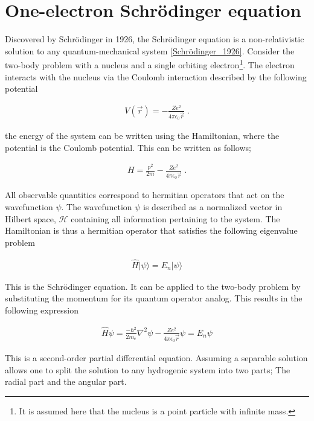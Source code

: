     \section{One-electron Schrödinger equation} \label{sec:Schrodinger_Equation}
        Discovered by Schrödinger in 1926, the Schrödinger equation is a non-relativistic solution to any quantum-mechanical system \ref{Schrödinger_1926}. Consider the two-body problem with a nucleus and a single orbiting electron\footnote{It is assumed here that the nucleus is a point particle with infinite mass.}. The electron interacts with the nucleus via the Coulomb interaction described by the following potential

        \begin{align}
            V(\vec{r}) = -\frac{Z e^2}{4\pi \epsilon_0 \vec{r}}\;.
        \end{align}

        \noindent the energy of the system can be written using the Hamiltonian, where the potential is the Coulomb potential. This can be written as follows;

        \begin{align}
            H = \frac{p^2}{2m} -\frac{Z e^2}{4\pi \epsilon_0 \vec{r}}\;.
        \end{align}

        \noindent All observable quantities correspond to hermitian operators that act on the wavefunction $\psi$. The wavefunction $\psi$ is described as a normalized vector in Hilbert space, $\mathcal{H}$ containing all information pertaining to the system. The Hamiltonian is thus a hermitian operator that satisfies the following eigenvalue problem 

        \begin{align}
            \hat{H} \vert\psi \rangle = E_n \vert \psi \rangle
        \end{align}

        This is the Schrödinger equation. It can be applied to the two-body problem by substituting the momentum for its quantum operator analog. This results in the following expression 

        \begin{align}
            \hat{H} \psi  = \frac{-\hbar^2}{2m_e} \nabla^2 \psi -\frac{Z e^2}{4\pi \epsilon_0 \vec{r}} \psi = E_n \psi 
        \end{align}

        This is a second-order partial differential equation. Assuming a separable solution allows one to split the solution to any hydrogenic system into two parts; The radial part and the angular part.

